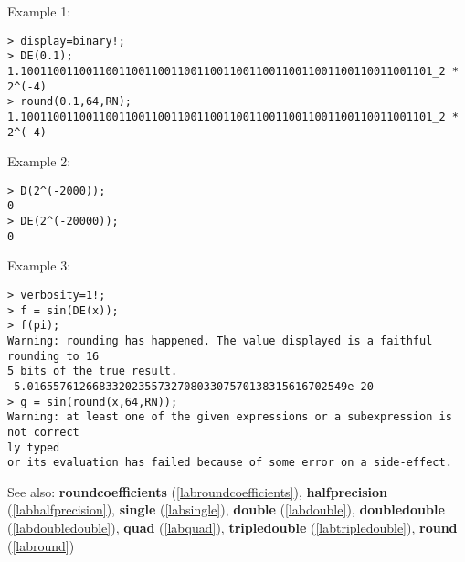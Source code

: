 \noindent Example 1: 
\begin{center}\begin{minipage}{15cm}\begin{Verbatim}[frame=single]
> display=binary!;
> DE(0.1);
1.100110011001100110011001100110011001100110011001100110011001101_2 * 2^(-4)
> round(0.1,64,RN);
1.100110011001100110011001100110011001100110011001100110011001101_2 * 2^(-4)
\end{Verbatim}
\end{minipage}\end{center}
\noindent Example 2: 
\begin{center}\begin{minipage}{15cm}\begin{Verbatim}[frame=single]
> D(2^(-2000));
0
> DE(2^(-20000));
0
\end{Verbatim}
\end{minipage}\end{center}
\noindent Example 3: 
\begin{center}\begin{minipage}{15cm}\begin{Verbatim}[frame=single]
> verbosity=1!;
> f = sin(DE(x));
> f(pi);
Warning: rounding has happened. The value displayed is a faithful rounding to 16
5 bits of the true result.
-5.0165576126683320235573270803307570138315616702549e-20
> g = sin(round(x,64,RN));
Warning: at least one of the given expressions or a subexpression is not correct
ly typed
or its evaluation has failed because of some error on a side-effect.
\end{Verbatim}
\end{minipage}\end{center}
See also: \textbf{roundcoefficients} (\ref{labroundcoefficients}), \textbf{halfprecision} (\ref{labhalfprecision}), \textbf{single} (\ref{labsingle}), \textbf{double} (\ref{labdouble}), \textbf{doubledouble} (\ref{labdoubledouble}), \textbf{quad} (\ref{labquad}), \textbf{tripledouble} (\ref{labtripledouble}), \textbf{round} (\ref{labround})
